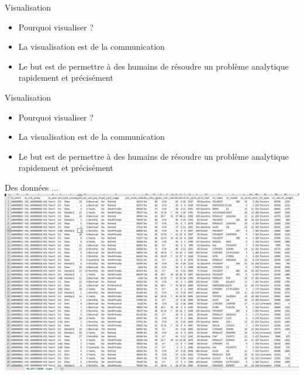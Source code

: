 \documentclass[french]{beamer}
\begin{document}
 \begin{frame}{Visualisation}
\begin{itemize}
	\item Pourquoi visualiser ?
	\item La visualisation est de la communication
	\item Le but est de permettre à des humains de résoudre un problème analytique rapidement et précisément
\end{itemize}
\end{frame}

 \begin{frame}{Visualisation}
\begin{itemize}
	\item Pourquoi visualiser ?
	\item La visualisation est de la communication
	\item Le but est de permettre à des humains de résoudre un problème analytique rapidement et précisément
\end{itemize}
\end{frame}

 \begin{frame}{Des données ... }
	\vspace{-0.2cm}
	\hspace*{-0.9cm}
	\includegraphics[width=1.2\textwidth]{data}
\end{frame}
\end{document}
